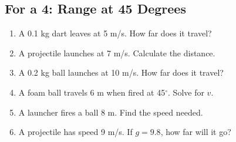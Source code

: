 \documentclass{article}
\begin{document}
\subsection{For a 4: Range at 45 Degrees}
\begin{enumerate}
    \item A 0.1 kg dart leaves at 5 m/s. How far does it travel?
    \item A projectile launches at 7 m/s. Calculate the distance.
    \item A 0.2 kg ball launches at 10 m/s. How far does it travel?
    \item A foam ball travels 6 m when fired at 45$^\circ$. Solve for $v$.
    \item A launcher fires a ball 8 m. Find the speed needed.
    \item A projectile has speed 9 m/s. If $g=9.8$, how far will it go?
\end{enumerate}
\end{document}
